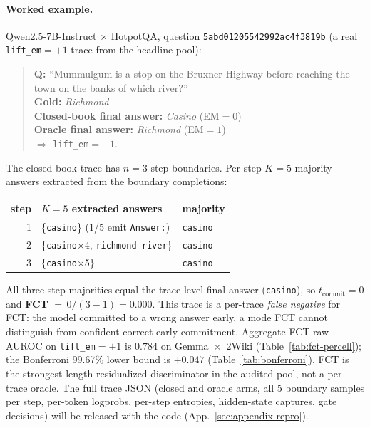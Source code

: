 \documentclass[11pt]{article}
\begin{document}
\paragraph{Worked example.} Qwen2.5-7B-Instruct $\times$ HotpotQA, question \texttt{5abd01205542992ac4f3819b} (a real \texttt{lift\_em}${=}{+}1$ trace from the headline pool):
\begin{quote}\small
\textbf{Q:} ``Mummulgum is a stop on the Bruxner Highway before reaching the town on the banks of which river?''\\
\textbf{Gold:} \emph{Richmond}\\
\textbf{Closed-book final answer:} \emph{Casino} (EM${=}0$)\\
\textbf{Oracle final answer:} \emph{Richmond} (EM${=}1$)\\
$\Rightarrow$ \texttt{lift\_em}${=}{+}1$.
\end{quote}
The closed-book trace has $n{=}3$ step boundaries. Per-step $K{=}5$ majority answers extracted from the boundary completions:
\begin{center}\small
\begin{tabular}{@{}rll@{}}
\toprule
\textbf{step} & \textbf{$K{=}5$ extracted answers} & \textbf{majority} \\
\midrule
1 & \{\texttt{casino}\} (1/5 emit \texttt{Answer:})       & \texttt{casino} \\
2 & \{\texttt{casino}$\times$4, \texttt{richmond river}\} & \texttt{casino} \\
3 & \{\texttt{casino}$\times$5\}                          & \texttt{casino} \\
\bottomrule
\end{tabular}
\end{center}
\noindent All three step-majorities equal the trace-level final answer (\texttt{casino}), so $t_{\text{commit}}{=}0$ and \textbf{FCT} ${=}\,0/(3{-}1){=}0.000$. This trace is a per-trace \emph{false negative} for FCT: the model committed to a wrong answer early, a mode FCT cannot distinguish from confident-correct early commitment. Aggregate FCT raw AUROC on \texttt{lift\_em}${=}{+}1$ is $0.784$ on Gemma~$\times$~2Wiki (Table~\ref{tab:fct-percell}); the Bonferroni 99.67\% lower bound is $+0.047$ (Table~\ref{tab:bonferroni}). FCT is the strongest length-residualized discriminator in the audited pool, not a per-trace oracle. The full trace JSON (closed and oracle arms, all 5 boundary samples per step, per-token logprobs, per-step entropies, hidden-state captures, gate decisions) will be released with the code (App.~\ref{sec:appendix-repro}).
\end{document}
